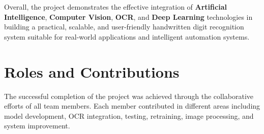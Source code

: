 \documentclass[12pt,a4paper]{article}
\begin{document}
\vspace{0.3cm}

\noindent
Overall, the project demonstrates the effective integration of \textbf{Artificial Intelligence}, \textbf{Computer Vision}, \textbf{OCR}, and \textbf{Deep Learning} technologies in building a practical, scalable, and user-friendly handwritten digit recognition system suitable for real-world applications and intelligent automation systems.

\newpage

\section{Roles and Contributions}

\vspace{0.3cm}

\noindent
The successful completion of the project was achieved through the collaborative efforts of all team members. Each member contributed in different areas including model development, OCR integration, testing, retraining, image processing, and system improvement.

\vspace{0.5cm}

\renewcommand{\arraystretch}{1.5}
\end{document}
